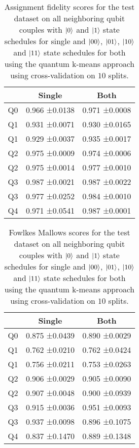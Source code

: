 \documentclass[conference]{IEEEtran}
\begin{document}
\begin{table}[]
\begin{tabular}{lll}
   & \multicolumn{1}{c}{Single} & \multicolumn{1}{c}{Both} \\ \hline
Q0 &    0.966 ±0.0138           &       0.971 ±0.0008      \\
Q1 &    0.931 ±0.0071           &       0.930 ±0.0165      \\ \hline
Q1 &    0.929 ±0.0037           &       0.935 ±0.0017      \\
Q2 &    0.975 ±0.0009           &       0.974 ±0.0006      \\ \hline
Q2 &    0.975 ±0.0014           &       0.977 ±0.0010      \\
Q3 &    0.987 ±0.0021           &       0.987 ±0.0022      \\ \hline
Q3 &    0.977 ±0.0252           &       0.984 ±0.0010      \\
Q4 &    0.971 ±0.0541           &       0.987 ±0.0001
\end{tabular}
\caption{Assignment fidelity scores for the test dataset on all neighboring qubit couples with \(\ket{0}\) and \(\ket{1}\) state schedules for single and \(\ket{00}\), \(\ket{01}\), \(\ket{10}\) and \(\ket{11}\) state schedules for both using the quantum k-means approach using cross-validation on \(10\) splits.}
\label{table:quantum_assignment}
\end{table}

\begin{table}[]
\begin{tabular}{lll}
   & \multicolumn{1}{c}{Single} & \multicolumn{1}{c}{Both} \\ \hline
Q0 &    0.875 ±0.0439           &       0.890 ±0.0029      \\
Q1 &    0.762 ±0.0210           &       0.762 ±0.0424      \\ \hline
Q1 &    0.756 ±0.0211           &       0.753 ±0.0263      \\
Q2 &    0.906 ±0.0029           &       0.905 ±0.0090      \\ \hline
Q2 &    0.907 ±0.0048           &       0.900 ±0.0939      \\
Q3 &    0.915 ±0.0036           &       0.951 ±0.0093      \\ \hline
Q3 &    0.937 ±0.0098           &       0.896 ±0.1075      \\
Q4 &    0.837 ±0.1470           &       0.889 ±0.1348
\end{tabular}
\caption{Fowlkes Mallows scores for the test dataset on all neighboring qubit couples with \(\ket{0}\) and \(\ket{1}\) state schedules for single and \(\ket{00}\), \(\ket{01}\), \(\ket{10}\) and \(\ket{11}\) state schedules for both using the quantum k-means approach using cross-validation on \(10\) splits.}
\label{table:quantum_fowlkes}
\end{table}
\end{document}
